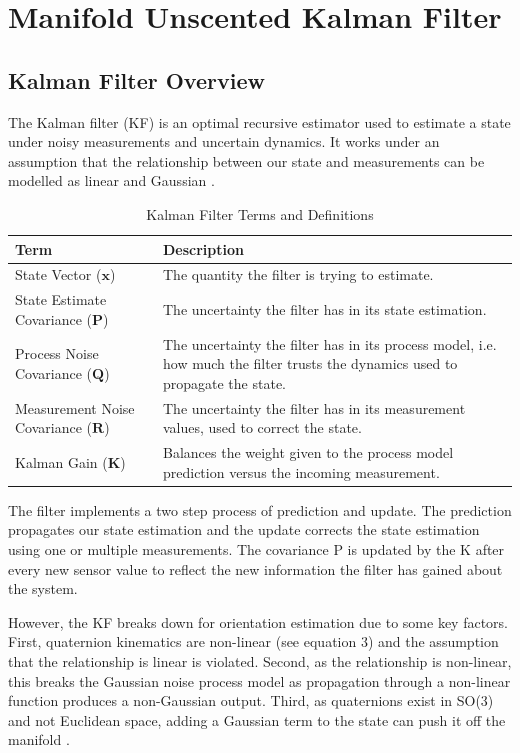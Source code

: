 \section{Manifold Unscented Kalman Filter}

\subsection{Kalman Filter Overview}
The Kalman filter (KF) is an optimal recursive estimator used to estimate a 
state under noisy measurements and uncertain dynamics. It works under an assumption that the relationship
between our state and measurements can be modelled as linear and Gaussian \cite{welch_2006_an}.

\begin{table}[!htbp]
\centering
\small
\begin{tabular}{p{3.5cm} p{8.5cm}}
\hline
\textbf{Term} & \textbf{Description} \\
\hline
State Vector ($\mathbf{x}$) & The quantity the filter is trying to estimate. \\
State Estimate Covariance ($\mathbf{P}$) & The uncertainty the filter has in its state estimation. \\
Process Noise Covariance ($\mathbf{Q}$) & The uncertainty the filter has in its process model, i.e. how much the filter trusts the dynamics used to propagate the state. \\
Measurement Noise Covariance ($\mathbf{R}$) & The uncertainty the filter has in its measurement values, used to correct the state. \\
Kalman Gain ($\mathbf{K}$) & Balances the weight given to the process model prediction versus the incoming measurement. \\
\hline
\end{tabular}
\caption{Kalman Filter Terms and Definitions}
\label{tab:kf_terms}
\end{table}

The filter implements a two step process of prediction and update. The prediction
propagates our state estimation and the update corrects the state estimation using one
or multiple measurements. The covariance P is updated by the K after every new sensor value to reflect
the new information the filter has gained about the system.

However, the KF breaks down for orientation estimation due to some key factors. First, quaternion kinematics are
non-linear (see equation 3) and the assumption that the relationship is linear is violated. Second, as the relationship is non-linear, this
breaks the Gaussian noise process model as propagation through a non-linear function produces a non-Gaussian output. Third,
as quaternions exist in SO(3) and not Euclidean space, adding a Gaussian term to the state can push it off the manifold \cite{gallo_2022_the}.




